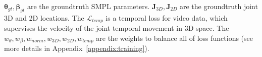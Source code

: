 $\boldsymbol{\theta}_{gt}, \boldsymbol{\beta}_{gt}$ are the groundtruth SMPL parameters. $\boldsymbol{J}_{3D}, \boldsymbol{J}_{2D}$ are the groundtruth joint 3D and 2D locations. The $\mathcal{L}_{temp}$ is a temporal loss for video data, which supervises the velocity of the joint temporal movement in 3D space. The $w_{\theta}, w_{\beta}, w_{norm}, w_{3D}, w_{2D}, w_{temp}$ are the weights to balance all of loss functions (see more details in Appendix~\ref{appendix:training}).
